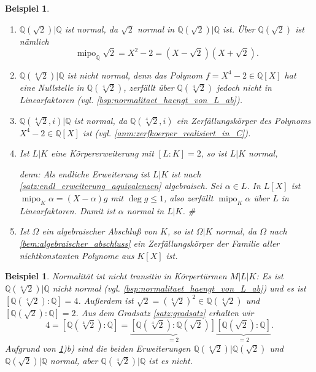 \documentclass[a4paper, twoside, 11pt, ngerman]{report}
\newcommand{\QQ}{\mathds Q}
\DeclareMathOperator{\mipo}{mipo}
\theoremstyle{definistyle}
\newtheorem{bsp}[satz]{Beispiel}
\theoremstyle{remark}
\newenvironment{denn}%
  {\par\textit{denn:}}%
  {\hfill\#\par}
\begin{document}
\begin{bsp}\label{bsp:normale_erweiterungen}
\begin{enumerate}[label=(\alph*)]
\item $\QQ(\sqrt{2})|\QQ$ ist normal, da $\sqrt{2}$ normal in $\QQ(\sqrt{2})|\QQ$ ist.
Über $\QQ(\sqrt{2})$ ist nämlich 
\[
\mipo_\QQ\sqrt{2}=X^2-2=(X-\sqrt{2})(X+\sqrt{2}).
\]
\item $\QQ(\sqrt[4]{2})|\QQ$ ist nicht normal, denn das Polynom $f=X^4-2\in\QQ[X]$ hat eine Nullstelle in $\QQ(\sqrt[4]{2})$, zerfällt über $\QQ(\sqrt[4]{2})$ jedoch nicht in Linearfaktoren (vgl. \ref{bsp:normalitaet_haengt_von_L_ab}). 
\item $\QQ(\sqrt[4]{2},i)|\QQ$ ist normal, da $\QQ(\sqrt[4]{2},i)$ ein Zerfällungskörper
des Polynoms $X^4-2\in\QQ[X]$ ist (vgl. \ref{anm:zerfkoerper_realisiert_in_C}).
\item Ist $L|K$ eine Körpererweiterung mit $[L:K] = 2$, so ist $L|K$ normal,
\begin{denn}
Als endliche Erweiterung ist $L|K$ ist nach \ref{satz:endl_erweiterung_aquivalenzen} algebraisch.  
Sei $\alpha \in L$. In $L[X]$ ist $\mipo_K\alpha=(X-\alpha)g$ mit $\deg g \leq 1$,  
also zerfällt $\mipo_K\alpha$ über $L$ in Linearfaktoren. Damit ist $\alpha$ normal in $L|K$. 
\end{denn}

\item Ist $\Omega$ ein algebraischer Abschluß von $K$, so ist $\Omega|K$ normal,  
da $\Omega$ nach \ref{bem:algebraischer_abschluss} ein Zerfällungskörper der Familie aller nichtkonstanten Polynome aus $K[X]$ ist.
\end{enumerate}
\end{bsp}

\begin{bsp}\label{bsp:normalitaet_nicht_transitiv}
Normalität ist nicht transitiv in Körpertürmen $M|L|K$: 
Es ist $\QQ(\sqrt[4]{2})|\QQ$ nicht normal (vgl. \ref{bsp:normalitaet_haengt_von_L_ab}) und es ist $[\QQ(\sqrt[4]{2}):\QQ]=4$. Außerdem ist $\sqrt{2} = (\sqrt[4]{2})^2\in \QQ(\sqrt[4]{2})$ und $[\QQ(\sqrt{2}):\QQ] = 2$.  Aus dem Gradsatz \ref{satz:gradsatz} erhalten wir
\[4=[\QQ(\sqrt[4]{2}):\QQ] = \underbrace{[\QQ(\sqrt[4]{2}):\QQ(\sqrt{2})]}_{=2}\underbrace{[\QQ(\sqrt{2}):\QQ]}_{=2}.\]
Aufgrund von \ref{bsp:normale_erweiterungen})b) sind die beiden Erweiterungen $\QQ(\sqrt[4]{2})|\QQ(\sqrt{2})$ und $\QQ(\sqrt{2})|\QQ$  normal, aber $\QQ(\sqrt[4]{2})|\QQ$ ist es nicht.
\end{bsp}
\end{document}
